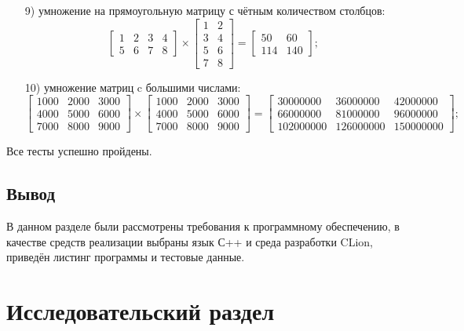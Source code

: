 \documentclass[a4paper,14pt]{article}
\begin{document}
\begin{enumerate}
	\item[9)] умножение на  прямоугольную матрицу с чётным количеством столбцов:
\[ \begin{bmatrix}
1 & 2 & 3 & 4\\
5 & 6 & 7 & 8
\end{bmatrix} \times 
\begin{bmatrix}
1 & 2 \\
3 & 4 \\
5 & 6 \\
7 & 8
\end{bmatrix} =
\begin{bmatrix}
50 & 60 \\
114 & 140
\end{bmatrix}; \]

	\item[10)] умножение матриц c большими числами:	
\[ \begin{bmatrix}
1000 & 2000 & 3000 \\
4000 & 5000 & 6000  \\
7000 & 8000 & 9000
\end{bmatrix} \times 
 \begin{bmatrix}
1000 & 2000 & 3000 \\
4000 & 5000 & 6000  \\
7000 & 8000 & 9000
\end{bmatrix} =
\begin{bmatrix}
30000000 & 36000000 & 42000000 \\
66000000 & 81000000 & 96000000 \\
102000000 & 126000000 & 150000000
\end{bmatrix}; \]

	\end{enumerate}
    	
    Все тесты успешно пройдены.
	

	
	
	\subsection*{Вывод}
	
	В данном разделе были рассмотрены требования к программному обеспечению, в качестве средств реализации выбраны язык С++ и среда разработки CLion, приведён листинг программы и тестовые данные. 

\pagebreak

\section{Исследовательский раздел}
\end{document}
